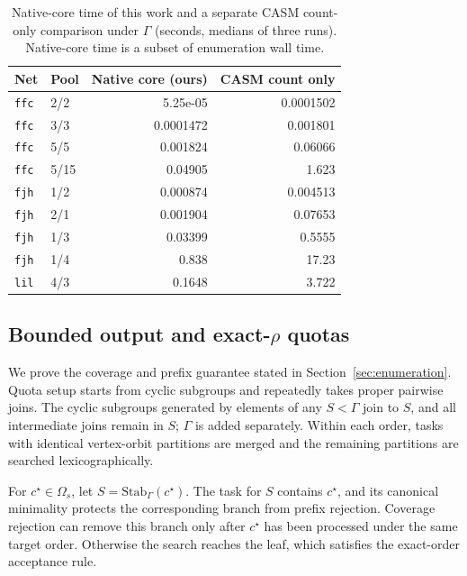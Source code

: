 \documentclass[a5paper, 10pt]{article}
\begin{document}
\begin{table}[H]
\centering\scriptsize
\setlength{\tabcolsep}{1.2mm}
\caption{Native-core time of this work and a separate CASM count-only comparison under $\Gamma$ (seconds, medians of three runs). Native-core time is a subset of enumeration wall time.}
\begin{tabular}{llrr}
\toprule
Net & Pool & Native core (ours) & CASM count only \\
\midrule
\texttt{ffc} & 2/2 & 5.25e-05 & 0.0001502 \\
\texttt{ffc} & 3/3 & 0.0001472 & 0.001801 \\
\texttt{ffc} & 5/5 & 0.001824 & 0.06066 \\
\texttt{ffc} & 5/15 & 0.04905 & 1.623 \\
\texttt{fjh} & 1/2 & 0.000874 & 0.004513 \\
\texttt{fjh} & 2/1 & 0.001904 & 0.07653 \\
\texttt{fjh} & 1/3 & 0.03399 & 0.5555 \\
\texttt{fjh} & 1/4 & 0.838 & 17.23 \\
\texttt{lil} & 4/3 & 0.1648 & 3.722 \\
\bottomrule
\end{tabular}
\end{table}

\endgroup

\subsection{Bounded output and exact-$\rho$ quotas}
\label{app:quota_proof}

We prove the coverage and prefix guarantee stated in Section~\ref{sec:enumeration}. Quota setup starts from cyclic subgroups and repeatedly takes proper pairwise joins. The cyclic subgroups generated by elements of any $S<\Gamma$ join to $S$, and all intermediate joins remain in $S$; $\Gamma$ is added separately. Within each order, tasks with identical vertex-orbit partitions are merged and the remaining partitions are searched lexicographically.

For $c^\star\in\Omega_s$, let $S=\mathrm{Stab}_{\Gamma}(c^\star)$. The task for $S$ contains $c^\star$, and its canonical minimality protects the corresponding branch from prefix rejection. Coverage rejection can remove this branch only after $c^\star$ has been processed under the same target order. Otherwise the search reaches the leaf, which satisfies the exact-order acceptance rule.
\end{document}
